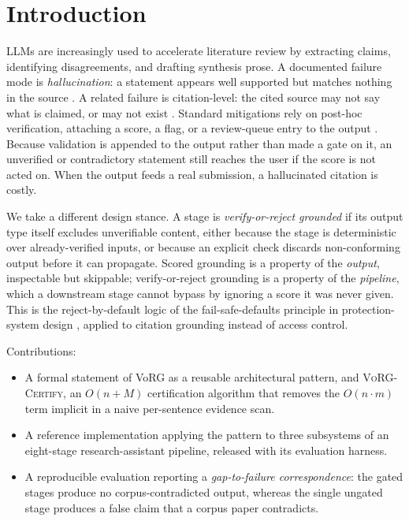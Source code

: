 \documentclass[conference]{IEEEtran}
\begin{document}
\section{Introduction}
LLMs are increasingly used to accelerate literature review by extracting claims,
identifying disagreements, and drafting synthesis prose. A documented failure
mode is \emph{hallucination}: a statement appears well supported but matches
nothing in the source \cite{ji2023survey,zhang2025hallucination}. A related
failure is citation-level: the cited source may not say what is claimed, or may
not exist \cite{zhang2025citation}. Standard mitigations rely on post-hoc
verification, attaching a score, a flag, or a review-queue entry to the output
\cite{li2025enhancing}. Because validation is appended to the output rather than
made a gate on it, an unverified or contradictory statement still reaches the
user if the score is not acted on. When the output feeds a real submission, a
hallucinated citation is costly.

We take a different design stance. A stage is \emph{verify-or-reject grounded} if
its output type itself excludes unverifiable content, either because the stage is
deterministic over already-verified inputs, or because an explicit check discards
non-conforming output before it can propagate. Scored grounding is a property of
the \emph{output}, inspectable but skippable; verify-or-reject grounding is a
property of the \emph{pipeline}, which a downstream stage cannot bypass by
ignoring a score it was never given. This is the reject-by-default logic of the
fail-safe-defaults principle in protection-system design \cite{saltzer1975protection},
applied to citation grounding instead of access control.

Contributions:
\begin{itemize}
\item A formal statement of VoRG as a reusable architectural pattern, and
\textsc{VoRG-Certify}, an $O(n{+}M)$ certification algorithm that removes the
$O(n{\cdot}m)$ term implicit in a naive per-sentence evidence scan.
\item A reference implementation applying the pattern to three subsystems of an
eight-stage research-assistant pipeline, released with its evaluation harness.
\item A reproducible evaluation reporting a \emph{gap-to-failure correspondence}:
the gated stages produce no corpus-contradicted output, whereas the single
ungated stage produces a false claim that a corpus paper contradicts.
\end{itemize}
\end{document}
